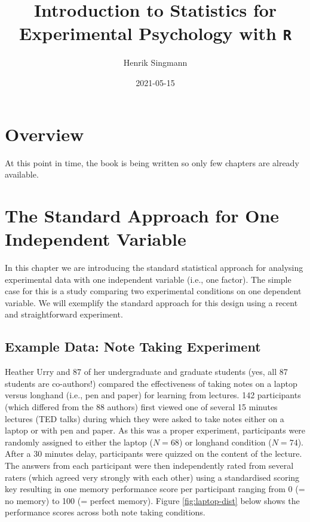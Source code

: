 \documentclass[
]{book}
\title{Introduction to Statistics for Experimental Psychology with \texttt{R}}
\author{Henrik Singmann}
\date{2021-05-15}
\begin{document}
\maketitle

{
\setcounter{tocdepth}{1}
\tableofcontents
}
\hypertarget{overview}{%
\chapter{Overview}\label{overview}}

At this point in time, the book is being written so only few chapters are already available.

\hypertarget{standard1}{%
\chapter{The Standard Approach for One Independent Variable}\label{standard1}}

In this chapter we are introducing the standard statistical approach for analysing experimental data with one independent variable (i.e., one factor). The simple case for this is a study comparing two experimental conditions on one dependent variable. We will exemplify the standard approach for this design using a recent and straightforward experiment.

\hypertarget{ex:urry}{%
\section{Example Data: Note Taking Experiment}\label{ex:urry}}

Heather Urry and 87 of her undergraduate and graduate students \citep{urry2021} (yes, all 87 students are co-authors!) compared the effectiveness of taking notes on a laptop versus longhand (i.e., pen and paper) for learning from lectures. 142 participants (which differed from the 88 authors) first viewed one of several 15 minutes lectures (TED talks) during which they were asked to take notes either on a laptop or with pen and paper. As this was a proper experiment, participants were randomly assigned to either the laptop (\(N = 68\)) or longhand condition (\(N = 74\)). After a 30 minutes delay, participants were quizzed on the content of the lecture. The answers from each participant were then independently rated from several raters (which agreed very strongly with each other) using a standardised scoring key resulting in one memory performance score per participant ranging from 0 (= no memory) to 100 (= perfect memory). Figure \ref{fig:laptop-dist} below shows the performance scores across both note taking conditions.
\end{document}
